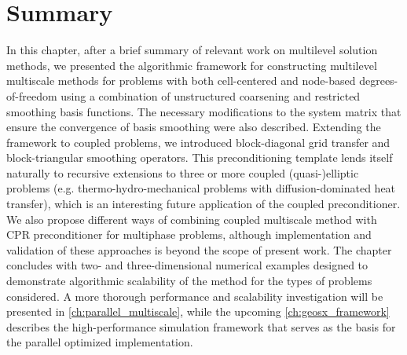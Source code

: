 

\section{Summary}
\label{sec:msrsb_summary}

In this chapter, after a brief summary of relevant work on multilevel solution methods, we presented the algorithmic framework for constructing multilevel multiscale methods for problems with both cell-centered and node-based degrees-of-freedom using a combination of unstructured coarsening and restricted smoothing basis functions.   The necessary modifications to the system matrix that ensure the convergence of basis smoothing were also described.   Extending the framework to coupled problems, we introduced block-diagonal grid transfer and block-triangular smoothing operators.   This preconditioning template lends itself naturally to recursive extensions to three or more coupled (quasi-)elliptic problems (e.g. thermo-hydro-mechanical problems with diffusion-dominated heat transfer), which is an interesting future application of the coupled preconditioner.   We also propose different ways of combining coupled multiscale method with CPR preconditioner for multiphase problems, although implementation and validation of these approaches is beyond the scope of present work.   The chapter concludes with two- and three-dimensional numerical examples designed to demonstrate algorithmic scalability of the method for the types of problems considered.   A more thorough performance and scalability investigation will be presented in \cref{ch:parallel_multiscale}, while the upcoming \cref{ch:geosx_framework} describes the high-performance simulation framework that serves as the basis for the parallel optimized implementation.